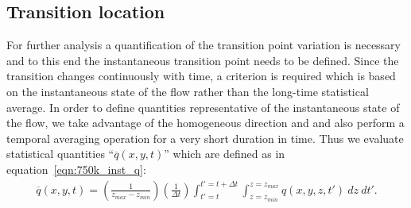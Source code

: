 \subsection{Transition location}
For further analysis a quantification of the transition point variation is necessary and to this end the instantaneous transition point needs to be defined. Since the transition changes continuously with time, a criterion is required which is based on the instantaneous state of the flow rather than the long-time statistical average. In order to define quantities representative of the instantaneous state of the flow, we take advantage of the homogeneous direction and and also perform a temporal averaging operation for a very short duration in time. Thus we evaluate statistical quantities ``$\overline{q}(x,y,t)$'' which are defined as in equation~\ref{eqn:750k_inst_q}:
\begin{align}
	\overline{q}(x,y,t) = \left(\frac{1}{z_{max}-z_{min}}\right)\left(\frac{1}{\Delta t}\right)\int_{t'=t}^{t'=t+\Delta t}\int_{z=z_{min}}^{z=z_{max}}q(x,y,z,t')\ dz\ dt'.
	\label{eqn:750k_inst_q}
\end{align}
